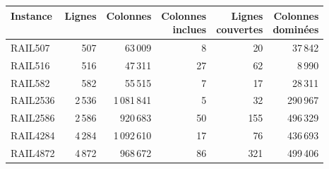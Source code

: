\begin{tabular}{lrrrrr}
	\toprule
	Instance & Lignes & Colonnes & \makecell{Colonnes\\inclues} & \makecell{Lignes\\couvertes} & \makecell{Colonnes\\dominées}\\
	\midrule
	RAIL507 & 507 & 63\,009 & 8 & 20 & 37\,842\\
	RAIL516 & 516 & 47\,311 & 27 & 62 & 8\,990\\
	RAIL582 & 582 & 55\,515 & 7 & 17 & 28\,311\\
	RAIL2536 & 2\,536 & 1\,081\,841 & 5 & 32 & 290\,967\\
	RAIL2586 & 2\,586 & 920\,683 & 50 & 155 & 496\,329\\
	RAIL4284 & 4\,284 & 1\,092\,610 & 17 & 76 & 436\,693\\
	RAIL4872 & 4\,872 & 968\,672 & 86 & 321 & 499\,406\\
	\bottomrule
\end{tabular}
